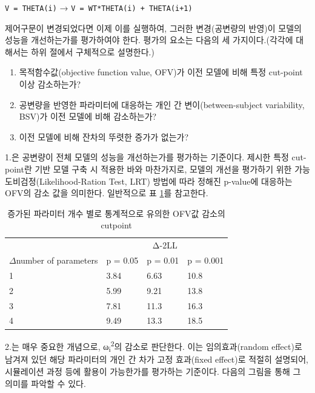 \documentclass[
  11pt,
  krantz2, a4paper, twoside]{krantz}
\providecommand{\tightlist}{%
  \setlength{\itemsep}{0pt}\setlength{\parskip}{0pt}}
\theoremstyle{definition}
\theoremstyle{definition}
\theoremstyle{definition}
\theoremstyle{remark}
\begin{document}
\texttt{V\ =\ THETA(i)} → \texttt{V\ =\ WT*THETA(i)\ +\ THETA(i+1)}

제어구문이 변경되었다면 이제 이를 실행하여, 그러한 변경(공변량의 반영)이 모델의 성능을 개선하는가를 평가하여야 한다. 평가의 요소는 다음의 세 가지이다.(각각에 대해서는 하위 절에서 구체적으로 설명한다.)

\begin{enumerate}
\def\labelenumi{\arabic{enumi}.}
\tightlist
\item
  목적함수값(objective function value, OFV)가 이전 모델에 비해 특정 cut-point 이상 감소하는가?
\item
  공변량을 반영한 파라미터에 대응하는 개인 간 변이(between-subject variability, BSV)가 이전 모델에 비해 감소하는가?
\item
  이전 모델에 비해 잔차의 뚜렷한 증가가 없는가?
\end{enumerate}

1.은 공변량이 전체 모델의 성능을 개선하는가를 평가하는 기준이다. 제시한 특정 cut-point란 기반 모델 구축 시 적용한 바와 마찬가지로, 모델의 개선을 평가하기 위한 가능도비검정(Likelihood-Ration Test, LRT) 방법에 따라 정해진 p-value에 대응하는 OFV의 감소 값을 의미한다. 일반적으로 표 \ref{tab:cutpoint-param}를 참고한다.

\begin{table}

\caption{\label{tab:cutpoint-param}증가된 파라미터 개수 별로 통계적으로 유의한 OFV값 감소의 cutpoint}
\centering
\begin{tabular}[t]{llll}
\toprule
\multicolumn{1}{c}{ } & \multicolumn{3}{c}{Δ-2LL} \\
\cmidrule(l{3pt}r{3pt}){2-4}
$\Delta$number of parameters & p = 0.05 & p = 0.01 & p = 0.001\\
\midrule
1 & 3.84 & 6.63 & 10.8\\
2 & 5.99 & 9.21 & 13.8\\
3 & 7.81 & 11.3 & 16.3\\
4 & 9.49 & 13.3 & 18.5\\
\bottomrule
\end{tabular}
\end{table}


2.는 매우 중요한 개념으로, ω\textsubscript{i}\textsuperscript{2}의 감소로 판단한다. 이는 임의효과(random effect)로 남겨져 있던 해당 파라미터의 개인 간 차가 고정 효과(fixed effect)로 적절히 설명되어, 시뮬레이션 과정 등에 활용이 가능한가를 평가하는 기준이다. 다음의 그림을 통해 그 의미를 파악할 수 있다.
\end{document}
